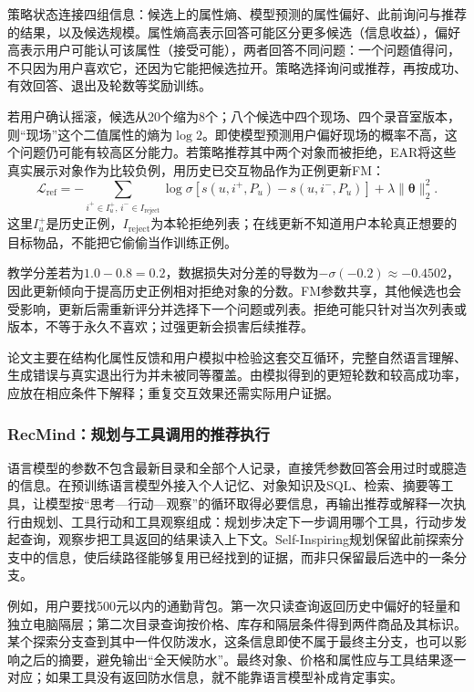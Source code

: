 策略状态连接四组信息：候选上的属性熵、模型预测的属性偏好、此前询问与推荐的结果，以及候选规模。属性熵高表示回答可能区分更多候选（信息收益），偏好高表示用户可能认可该属性（接受可能），两者回答不同问题：一个问题值得问，不只因为用户喜欢它，还因为它能把候选拉开。策略选择询问或推荐，再按成功、有效回答、退出及轮数等奖励训练。

若用户确认摇滚，候选从20个缩为8个；八个候选中四个现场、四个录音室版本，则“现场”这个二值属性的熵为$\log2$。即使模型预测用户偏好现场的概率不高，这个问题仍可能有较高区分能力。若策略推荐其中两个对象而被拒绝，EAR将这些真实展示对象作为比较负例，用历史已交互物品作为正例更新FM：
\[
 \mathcal L_{\mathrm{ref}}
 =-\sum_{i^+\in I_u^+,\,i^-\in I_{\mathrm{reject}}}
 \log\sigma\!\left[s(u,i^+,P_u)-s(u,i^-,P_u)\right]
 +\lambda\lVert\bm\theta\rVert_2^2.
\]
这里$I_u^+$是历史正例，$I_{\mathrm{reject}}$为本轮拒绝列表；在线更新不知道用户本轮真正想要的目标物品，不能把它偷偷当作训练正例。

教学分差若为$1.0-0.8=0.2$，数据损失对分差的导数为$-\sigma(-0.2)\approx-0.4502$，因此更新倾向于提高历史正例相对拒绝对象的分数。FM参数共享，其他候选也会受影响，更新后需重新评分并选择下一个问题或列表。拒绝可能只针对当次列表或版本，不等于永久不喜欢；过强更新会损害后续推荐。

论文主要在结构化属性反馈和用户模拟中检验这套交互循环，完整自然语言理解、生成错误与真实退出行为并未被同等覆盖。由模拟得到的更短轮数和较高成功率，应放在相应条件下解释；重复交互效果还需实际用户证据。

\subsubsection{RecMind：规划与工具调用的推荐执行}
\label{sec:rs-recmind}

语言模型的参数不包含最新目录和全部个人记录，直接凭参数回答会用过时或臆造的信息。在预训练语言模型外接入个人记忆、对象知识及SQL、检索、摘要等工具，让模型按“思考—行动—观察”的循环取得必要信息，再输出推荐或解释一次执行由规划、工具行动和工具观察组成：规划步决定下一步调用哪个工具，行动步发起查询，观察步把工具返回的结果读入上下文。Self-Inspiring规划保留此前探索分支中的信息，使后续路径能够复用已经找到的证据，而非只保留最后选中的一条分支。

例如，用户要找500元以内的通勤背包。第一次只读查询返回历史中偏好的轻量和独立电脑隔层；第二次目录查询按价格、库存和隔层条件得到两件商品及其标识。某个探索分支查到其中一件仅防泼水，这条信息即使不属于最终主分支，也可以影响之后的摘要，避免输出“全天候防水”。最终对象、价格和属性应与工具结果逐一对应；如果工具没有返回防水信息，就不能靠语言模型补成肯定事实。

